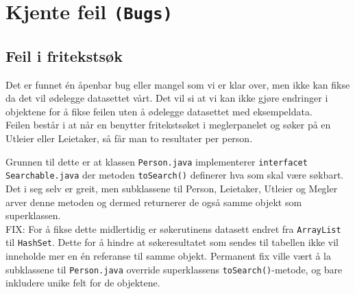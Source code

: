 \section{Kjente feil \texttt{(Bugs)}}
\subsection{Feil i fritekstsøk}
Det er funnet én åpenbar bug eller mangel som vi er klar over, men ikke kan fikse da det vil ødelegge datasettet vårt. Det vil si at vi kan ikke gjøre endringer i objektene for å fikse feilen uten å ødelegge datasettet med eksempeldata. \\
Feilen består i at når en benytter fritekstsøket i meglerpanelet og søker på en Utleier eller Leietaker, så får man to resultater per person. 

Grunnen til dette er at klassen \texttt{Person.java} implementerer \texttt{interfacet Searchable.java} der metoden \texttt{toSearch()} definerer hva som skal være søkbart. \\
Det i seg selv er greit, men subklassene til Person, Leietaker, Utleier og Megler arver denne metoden og dermed returnerer de også samme objekt som superklassen. \\

FIX: For å fikse dette midlertidig er søkerutinens datasett endret fra \texttt{ArrayList} til \texttt{HashSet}. Dette for å hindre at søkeresultatet som sendes til tabellen ikke vil inneholde mer en én referanse til samme objekt.
Permanent fix ville vært å la subklassene til \texttt{Person.java} override superklassens \texttt{toSearch()}-metode, og bare inkludere unike felt for de objektene.
